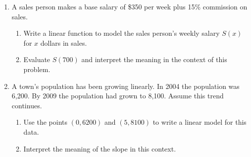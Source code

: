 



\begin{enumerate}
\item A sales person makes a base salary of \$350 per week plus 15\% commission on sales.
\begin{enumerate}
\item Write a linear function to model the sales person's weekly salary $S(x)$ for $x$ dollars in sales.\vfill
\item Evaluate $S(700)$ and interpret the meaning in the context of this problem.
\end{enumerate}

\vfill
\item A town's population has been growing linearly. In 2004 the population was 6,200. By 2009 the population had grown to 8,100. Assume this trend continues.

\begin{enumerate}
\item Use the points $(0,6200)$ and $(5,8100)$ to write a linear model for this data.
\vfill
\item Interpret the meaning of the slope in this context.
\end{enumerate}

\vfill




\end{enumerate}



